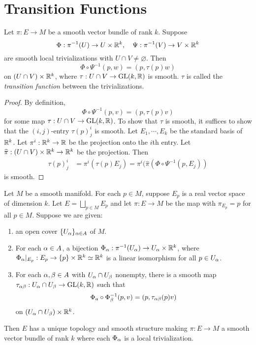 \section{Transition Functions}
\begin{lemma}\label{10.5}
    Let $\pi:E \to M$ be a smooth vector bundle of rank $k$. Suppose $$\Phi:\pi^{-1}(U) \to U \times \mathbb{R}^k, \quad \Psi: \pi^{-1}(V) \to V \times \mathbb{R}^k$$ are smooth local trivializations with 
    $U \cap V \neq \varnothing$. Then 
    $$\Phi \circ \Psi^{-1}(p, w) = (p, \tau(p)w)$$
    on $(U \cap V) \times \mathbb{R}^k$, where $\tau:U \cap V \to \mathrm{GL}(k,\mathbb{R})$ is smooth. $\tau$ is called the \textit{transition function} between the  trivializations.
\end{lemma}
\begin{proof}
    By definition, $$\Phi \circ \Psi^{-1}(p,v) = (p, \tau(p)v)$$ for some map $\tau:U \cap V \to \mathrm{GL}(k,\mathbb{R})$. To show that $\tau$ is smooth, it suffices to show that the $(i,j)$-entry $\tau(p)_j^i$ is smooth. Let $E_1, \cdots, E_k$ be the standard basis of $\mathbb{R}^k$. Let $\pi^i:\mathbb{R}^k \to \mathbb{R}$ be the projection onto the $i$th entry. Let $\widehat{\pi}:(U \cap V) \times \mathbb{R}^k \to \mathbb{R}^k$ be the projection. Then
    \begin{align*}
    \tau(p)_j^i &= \pi^i(\tau(p)E_j) 
    = \pi^i(\widehat{\pi}(\Phi \circ \Psi^{-1}(p, E_j)) 
    \end{align*}
    is smooth. 
\end{proof}
\begin{lemma}\label{10.6}
    Let $M$ be a smooth manifold. For each $p \in M$, suppose $E_p$ is a real vector space of dimension $k$. Let $E = \bigsqcup_{p \in M}E_p$ and let $\pi:E \to M$ be the map with $\pi_{E_p} = p$ for all $p \in M$. Suppose we are given:
    \begin{enumerate}
        \item an open cover $\{U_\alpha\}_{\alpha \in A}$ of $M$. 
        \item For each $\alpha \in A$, a bijection $\Phi_\alpha:\pi^{-1}(U_\alpha) \to U_\alpha \times \mathbb{R}^k$, where $\Phi_\alpha|_{E_p}:E_p \to \{p\} \times \mathbb{R}^k \simeq \mathbb{R}^k$ is a linear isomorphism for all $p \in U_\alpha$. 
        \item For each $\alpha, \beta \in A$ with $U_\alpha \cap U_\beta$ nonempty, there is a smooth map $\tau_{\alpha \beta}:U_\alpha \cap U_\beta \to \mathrm{GL}(k,\mathbb{R})$ such that 
        $$\Phi_a \circ \Phi_\beta^{-1}(p,v) = (p, \tau_{\alpha\beta}(p)v)$$ on $(U_\alpha \cap U_\beta) \times \mathbb{R}^k$. 
    \end{enumerate}
    Then $E$ has a unique topology and smooth structure making $\pi:E \to M$ a smooth vector bundle of rank $k$ where each $\Phi_\alpha$ is a local trivialization. 
\end{lemma}
